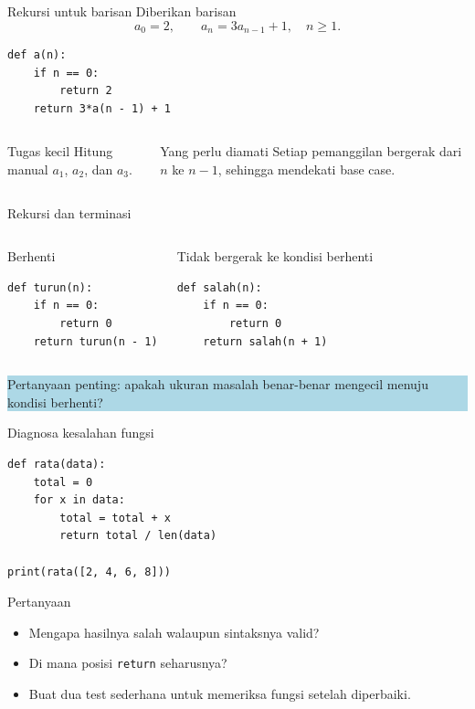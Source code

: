 \documentclass[aspectratio=169,11pt]{beamer}
\begin{document}
\begin{frame}[fragile]{Rekursi untuk barisan}
Diberikan barisan
\[
a_0=2,\qquad a_{n}=3a_{n-1}+1, \quad n\ge 1.
\]
\begin{lstlisting}
def a(n):
    if n == 0:
        return 2
    return 3*a(n - 1) + 1
\end{lstlisting}
\begin{columns}[T]
\begin{block}{Tugas kecil}
Hitung manual $a_1$, $a_2$, dan $a_3$.
\end{block}
\begin{block}{Yang perlu diamati}
Setiap pemanggilan bergerak dari $n$ ke $n-1$, sehingga mendekati base case.
\end{block}
\end{columns}
\end{frame}

\begin{frame}[fragile]{Rekursi dan terminasi}
\begin{columns}[T]
\begin{block}{Berhenti}
\begin{lstlisting}
def turun(n):
    if n == 0:
        return 0
    return turun(n - 1)
\end{lstlisting}
\end{block}
\begin{block}{Tidak bergerak ke kondisi berhenti}
\begin{lstlisting}
def salah(n):
    if n == 0:
        return 0
    return salah(n + 1)
\end{lstlisting}
\end{block}
\end{columns}
\vspace{1mm}
\colorbox{LightBlue}{\parbox{.96\linewidth}{\small Pertanyaan penting: apakah ukuran masalah benar-benar mengecil menuju kondisi berhenti?}}
\end{frame}

\begin{frame}[fragile]{Diagnosa kesalahan fungsi}
\begin{lstlisting}
def rata(data):
    total = 0
    for x in data:
        total = total + x
        return total / len(data)

print(rata([2, 4, 6, 8]))
\end{lstlisting}
\begin{block}{Pertanyaan}
\begin{itemize}
  \item Mengapa hasilnya salah walaupun sintaksnya valid?
  \item Di mana posisi \texttt{return} seharusnya?
  \item Buat dua test sederhana untuk memeriksa fungsi setelah diperbaiki.
\end{itemize}
\end{block}
\end{frame}
\end{document}
